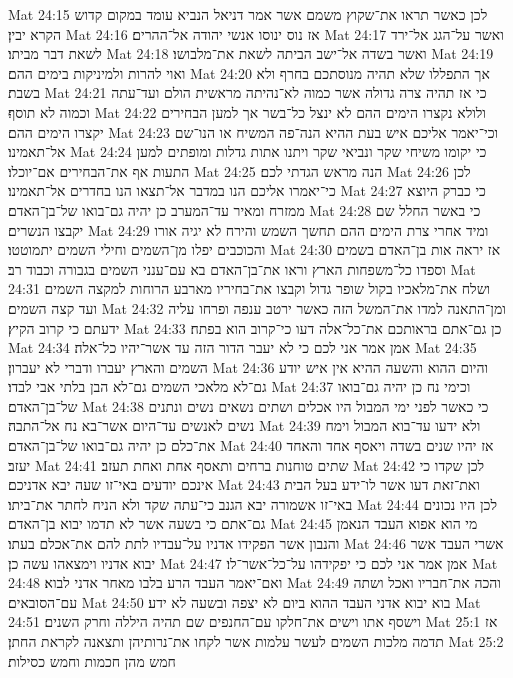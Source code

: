 Mat 24:15  לכן כאשר תראו את־שקוץ משמם אשר אמר דניאל הנביא עומד במקום קדוש הקרא יבין׃
Mat 24:16  אז נוס ינוסו אנשי יהודה אל־ההרים׃
Mat 24:17  ואשר על־הגג אל־ירד לשאת דבר מביתו׃
Mat 24:18  ואשר בשדה אל־ישב הביתה לשאת את־מלבושו׃
Mat 24:19  ואוי להרות ולמיניקות בימים ההם׃
Mat 24:20  אך התפללו שלא תהיה מנוסתכם בחרף ולא בשבת׃
Mat 24:21  כי אז תהיה צרה גדולה אשר כמוה לא־נהיתה מראשית הולם ועד־עתה וכמוה לא תוסף׃
Mat 24:22  ולולא נקצרו הימים ההם לא ינצל כל־בשר אך למען הבחירים יקצרו הימים ההם׃
Mat 24:23  וכי־יאמר אליכם איש בעת ההיא הנה־פה המשיח או הנו־שם אל־תאמינו׃
Mat 24:24  כי יקומו משיחי שקר ונביאי שקר ויתנו אתות גדלות ומופתים למען התעות אף את־הבחירים אם־יוכלו׃
Mat 24:25  הנה מראש הגדתי לכם׃
Mat 24:26  לכן כי־יאמרו אליכם הנו במדבר אל־תצאו הנו בחדרים אל־תאמינו׃
Mat 24:27  כי כברק היוצא ממזרח ומאיר עד־המערב כן יהיה גם־בואו של־בן־האדם׃
Mat 24:28  כי באשר החלל שם יקבצו הנשרים׃
Mat 24:29  ומיד אחרי צרת הימים ההם תחשך השמש והירח לא יגיה אורו והכוכבים יפלו מן־השמים וחילי השמים יתמוטטו׃
Mat 24:30  אז יראה אות בן־האדם בשמים וספדו כל־משפחות הארץ וראו את־בן־האדם בא עם־ענני השמים בגבורה וכבוד רב׃
Mat 24:31  ושלח את־מלאכיו בקול שופר גדול וקבצו את־בחיריו מארבע הרוחות למקצה השמים ועד קצה השמים׃
Mat 24:32  ומן־התאנה למדו את־המשל הזה כאשר ירטב ענפה ופרחו עליה ידעתם כי קרוב הקיץ׃
Mat 24:33  כן גם־אתם בראותכם את־כל־אלה דעו כי־קרוב הוא בפתח׃
Mat 24:34  אמן אמר אני לכם כי לא יעבר הדור הזה עד אשר־יהיו כל־אלה׃
Mat 24:35  השמים והארץ יעברו ודברי לא יעברון׃
Mat 24:36  והיום ההוא והשעה ההיא אין איש יודע גם־לא מלאכי השמים גם־לא הבן בלתי אבי לבדו׃
Mat 24:37  וכימי נח כן יהיה גם־בואו של־בן־האדם׃
Mat 24:38  כי כאשר לפני ימי המבול היו אכלים ושתים נשאים נשים ונתנים נשים לאנשים עד־היום אשר־בא נח אל־התבה׃
Mat 24:39  ולא ידעו עד־בוא המבול וימח את־כלם כן יהיה גם־בואו של־בן־האדם׃
Mat 24:40  אז יהיו שנים בשדה ויאסף אחד והאחד יעזב׃
Mat 24:41  שתים טוחנות ברחים ותאסף אחת ואחת תעזב׃
Mat 24:42  לכן שקדו כי אינכם יודעים באי־זו שעה יבא אדניכם׃
Mat 24:43  ואת־זאת דעו אשר לו־ידע בעל הבית באי־זו אשמורה יבא הגנב כי־עתה שקד ולא הניח לחתר את־ביתו׃
Mat 24:44  לכן היו נכונים גם־אתם כי בשעה אשר לא תדמו יבוא בן־האדם׃
Mat 24:45  מי הוא אפוא העבד הנאמן והנבון אשר הפקידו אדניו על־עבדיו לתת להם את־אכלם בעתו׃
Mat 24:46  אשרי העבד אשר יבוא אדניו וימצאהו עשה כן׃
Mat 24:47  אמן אמר אני לכם כי יפקידהו על־כל־אשר־לו׃
Mat 24:48  ואם־יאמר העבד הרע בלבו מאחר אדני לבוא׃
Mat 24:49  והכה את־חבריו ואכל ושתה עם־הסובאים׃
Mat 24:50  בוא יבוא אדני העבד ההוא ביום לא יצפה ובשעה לא ידע׃
Mat 24:51  וישסף אתו וישים את־חלקו עם־החנפים שם תהיה היללה וחרק השנים׃
Mat 25:1  אז תדמה מלכות השמים לעשר עלמות אשר לקחו את־נרותיהן ותצאנה לקראת החתן׃
Mat 25:2  חמש מהן חכמות וחמש כסילות׃
